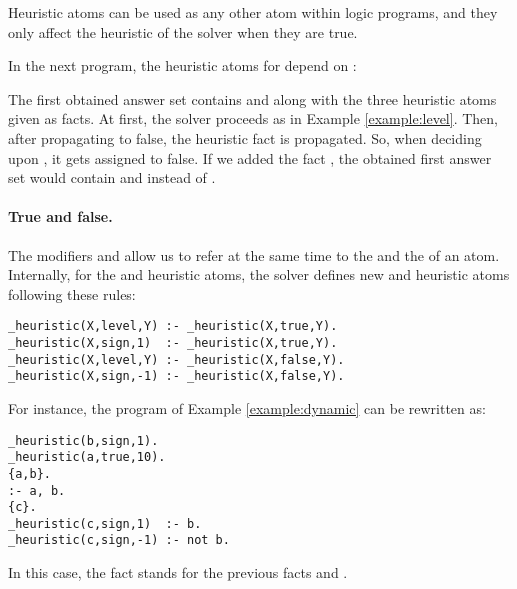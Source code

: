 Heuristic atoms can be used as any other atom within logic programs,
and they only affect the heuristic of the solver when they are true.
\begin{example}
\label{example:dynamic}
In the next program, the heuristic atoms for  depend on :

The first obtained answer set contains  and  along with the three heuristic atoms given as facts.
At first, the solver proceeds as in Example \ref{example:level}.
Then, after propagating  to false,  
the heuristic fact  is propagated.
So, when deciding upon , it gets assigned to false.  
If we added the fact ,
the obtained first answer set would contain  and  instead of .
\eexample
\end{example}

\paragraph{True and false.}

 The modifiers  and  allow us to refer at the same time to the  and the  of an atom.
 Internally,  for the  and  heuristic atoms,
 the solver defines new  and  heuristic atoms following these rules:
\begin{lstlisting}[numbers=none]
_heuristic(X,level,Y) :- _heuristic(X,true,Y).
_heuristic(X,sign,1)  :- _heuristic(X,true,Y).
_heuristic(X,level,Y) :- _heuristic(X,false,Y).
_heuristic(X,sign,-1) :- _heuristic(X,false,Y).
\end{lstlisting}
For instance, the program of Example \ref{example:dynamic}
can be rewritten as:
\begin{lstlisting}[numbers=none]
_heuristic(b,sign,1).
_heuristic(a,true,10).
{a,b}.
:- a, b.
{c}.
_heuristic(c,sign,1)  :- b.
_heuristic(c,sign,-1) :- not b.
\end{lstlisting}
In this case, the fact  stands for the previous
facts  and .

